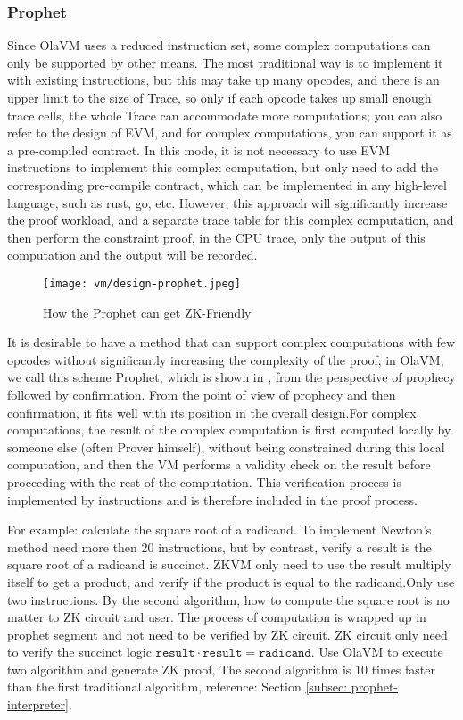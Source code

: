 \subsubsection{Prophet} \label{sec:design-prophet}

Since OlaVM uses a reduced instruction set, some complex computations can only be supported by other means.
The most traditional way is to implement it with existing instructions, but this may take up many opcodes, and there is an upper limit to the size of Trace, so only if each opcode takes up small enough trace cells, the whole Trace can accommodate more computations; you can also refer to the design of EVM, and for complex computations, you can support it as a pre-compiled contract.
In this mode, it is not necessary to use EVM instructions to implement this complex computation, but only need to add the corresponding pre-compile contract, which can be implemented in any high-level language, such as rust, go, etc.
However, this approach will significantly increase the proof workload, and a separate trace table for this complex computation, and then perform the constraint proof, in the CPU trace, only the output of this computation and the output will be recorded.

\begin{figure}[!ht]
    \centering
    \texttt{[image: vm/design-prophet.jpeg]}
    \caption{How the Prophet can get ZK-Friendly}
    \label{fig:design-prophet}
\end{figure}

It is desirable to have a method that can support complex computations with few opcodes without significantly increasing the complexity of the proof; in OlaVM, we call this scheme Prophet, which is shown in , from the perspective of prophecy followed by confirmation.
From the point of view of prophecy and then confirmation, it fits well with its position in the overall design.For complex computations, the result of the complex computation is first computed locally by someone else (often Prover himself), without being constrained during this local computation, and then the VM performs a validity check on the result before proceeding with the rest of the computation.
This verification process is implemented by instructions and is therefore included in the proof process.

For example: calculate the square root of a radicand.
To implement Newton's method need more then 20 instructions, but by contrast, verify a result is the square root of a radicand is succinct.
ZKVM only need to use the result multiply itself to get a product, and verify if the product is equal to the radicand.Only use two instructions.
By the second algorithm, how to compute the square root is no matter to ZK circuit and user.
The process of computation is wrapped up in prophet segment and not need to be verified by ZK circuit.
ZK circuit only need to verify the succinct logic $\texttt{result} \cdot \texttt{result} = \texttt{radicand}$.
Use OlaVM to execute two algorithm and generate ZK proof, The second algorithm is 10 times faster than the first traditional algorithm,
reference: Section \ref{subsec: prophet-interpreter}.

